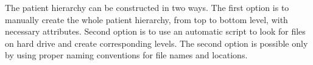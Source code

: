 \documentclass[type=dr, dr=rernat, accentcolor=tud7b,colorbacktitle, bigchapter, openright, twoside, 12pt ]{tudthesis}
\begin{document}
The patient hierarchy can be constructed in two ways. The first option is to manually create the whole patient hierarchy, from top to bottom level, with necessary attributes. Second option is to use an automatic script to look 
for files on hard drive and create corresponding levels. The second option is possible only by using proper naming conventions for file names and locations.


{}
% 
\end{document}
